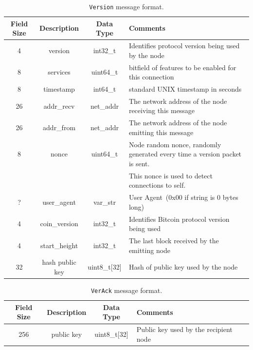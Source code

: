 \begin{table}[ht!]
\begin{center}
\caption{{\tt Version} message format.}
\label{tab:msg-version}
    \begin{tabular}{|c|c|c|l|} \hline
    \textbf{Field Size} & {\bf Description} & {\bf Data Type} & {\bf Comments} \\ \hline
    4 & version & int32\_t & Identifies protocol version being used by the node \\
    8 & services & uint64\_t & bitfield of features to be enabled for this connection \\
    8 & timestamp & int64\_t & standard UNIX timestamp in seconds \\
    26 & addr\_recv & net\_addr & The network address of the node receiving this message \\
    26 & addr\_from & net\_addr & The network address of the node emitting this message \\
    8 & nonce & uint64\_t & Node random nonce, randomly generated every time a version packet is sent. \\
    ~ & ~ & ~ & This nonce is used to detect connections to self.
 \\
    ? & user\_agent & var\_str & User Agent (0x00 if string is 0 bytes long) \\
    4 & coin\_version & int32\_t & Identifies Bitcoin protocol version being used \\
    4 & start\_height & int32\_t & The last block received by the emitting node \\
    32 & hash public key & uint8\_t[32] & Hash of public key used by the node \\ \hline
    \end{tabular}
\end{center}
\end{table}

\begin{table}[ht!]
\begin{center}
\caption{{\tt VerAck} message format.}
\label{tab:msg-verack}
    \begin{tabular}{|c|c|c|l|} \hline
    \textbf{Field Size} & {\bf Description} & {\bf Data Type} & {\bf Comments} \\ \hline
    256 & public key & uint8\_t[32] & Public key used by the recipient node \\ \hline
    \end{tabular}
\end{center}
\end{table}

